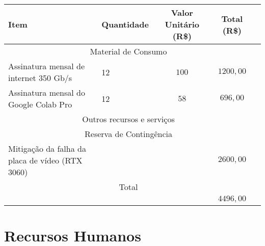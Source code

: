 \noindent \begin{tabular} {|X p{4cm}|c|c|c|}
	\hline
	{\cellcolor{shadecolor}} \textbf{Item}          & {\cellcolor{shadecolor}} \textbf{Quantidade} & {\cellcolor{shadecolor}} \textbf{Valor Unitário (R\$)} & {\cellcolor{shadecolor}} \textbf{Total (R\$)} \\ \hline
	\hline
	\multicolumn{4}{|c|}{Material de Consumo}                                                                                                                                                               \\ \hline
	Assinatura mensal de internet 350 Gb/s          & 12                                           & $100$                                                  & $1200,00$                                     \\ \hline
	Assinatura mensal do Google Colab Pro           & 12                                           & $58$                                                   & $696,00$                                      \\ \hline
	\hline
	\multicolumn{4}{|c|}{Outros recursos e serviços}                                                                                                                                                        \\ \hline
	\multicolumn{4}{|c|}{Reserva de Contingência}                                                                                                                                                           \\ \hline
	Mitigação da falha da placa de vídeo (RTX 3060) &                                              &                                                        & $2600,00$                                     \\ \hline
	\hline
	\multicolumn{4}{|c|}{Total}                                                                                                                                                                             \\ \hline
	                                                &                                              &                                                        & $4496,00$                                     \\ \hline
\end{tabular}

\section{Recursos Humanos}

